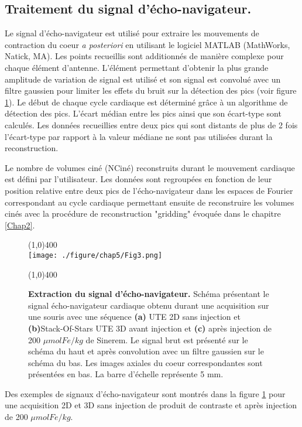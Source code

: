 \subsection{Traitement du signal d'écho-navigateur.}

Le signal d'écho-navigateur est utilisé pour extraire les mouvements de contraction du coeur \textit{a posteriori} en utilisant le logiciel MATLAB (MathWorks, Natick, MA).  Les points recueillis sont additionnés de manière complexe pour chaque élément d'antenne. L'élément permettant d'obtenir la plus grande amplitude de variation de signal est utilisé et son signal est convolué avec un filtre gaussien pour limiter les effets du bruit sur la détection des pics (voir figure \ref{fig:Signal}). Le début de chaque cycle cardiaque est déterminé grâce à un algorithme de détection des pics.  L'écart médian entre les pics ainsi que son écart-type sont calculés. Les données recueillies entre deux pics qui sont distants de plus de 2 fois l'écart-type par rapport à la valeur médiane ne sont pas utilisées durant la reconstruction.

Le nombre de volumes ciné (NCiné) reconstruits durant le mouvement cardiaque est défini par l'utilisateur. Les données sont regroupées en fonction de leur position relative entre deux pics de l'écho-navigateur dans les espaces de Fourier correspondant au cycle cardiaque permettant ensuite de reconstruire les volumes cinés avec la procédure de reconstruction "gridding" évoquée dans le chapitre \ref{Chap2}.

\begin{figure}[H]
\centering
\line(1,0){400} \\
\texttt{[image: ./figure/chap5/Fig3.png]}
\caption[Extraction du signal d'écho-navigateur.]{\label{fig:Signal} \textbf{Extraction du signal d'écho-navigateur.} Schéma présentant le signal écho-navigateur cardiaque obtenu durant une acquisition sur une souris avec une séquence \textbf{(a)} UTE 2D sans injection et \textbf{(b)}Stack-Of-Stars UTE 3D avant injection et \textbf{(c)} après injection de 200 $\mu mol Fe/kg$ de Sinerem. Le signal brut est présenté sur le schéma du haut et après convolution avec un filtre gaussien sur le schéma du bas. Les images axiales du coeur correspondantes sont présentées en bas. La barre d'échelle représente 5 mm.}
\line(1,0){400} \\ 
\end{figure}

Des exemples de signaux d'écho-navigateur sont montrés dans la figure \ref{fig:Signal} pour une acquisition 2D et 3D sans injection de produit de contraste et après injection de 200 $\mu mol Fe/kg$. 

